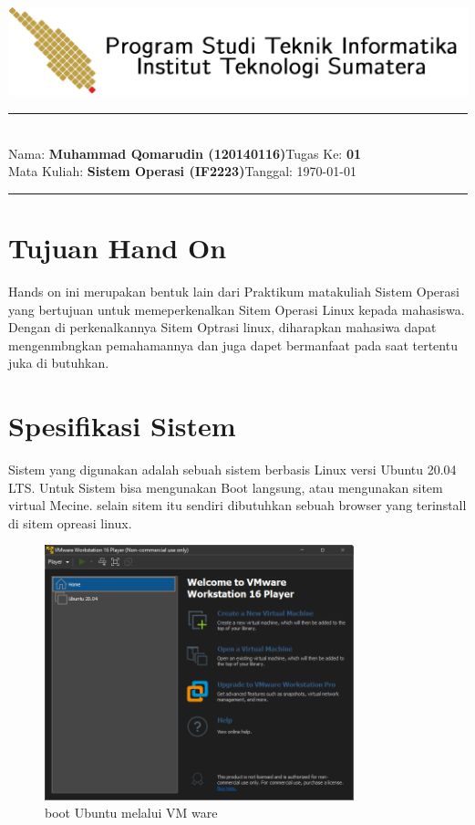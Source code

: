 \documentclass[11pt,a4paper]{article}
\newcommand{\stuid}{120140116}
\newcommand{\student}{\textbf{Muhammad Qomarudin (\stuid{})}}
\newcommand{\course}{\textbf{Sistem Operasi (IF2223)}}
\newcommand{\assignment}{\textbf{01}} %
\begin{document}
\thispagestyle{empty}
\begin{center}
	\includegraphics[scale = 0.15]{Figure/ifitera-header.png}
	\vspace{0.1cm}
\end{center}
\noindent
{\large
\rule{17cm}{0.2cm}\\[0.3cm]
Nama: \student \hfill Tugas Ke: \assignment\\[0.1cm]
Mata Kuliah: \course \hfill Tanggal: \today\\
\rule{17cm}{0.05cm}
\vspace{0.1cm}
}



\section{Tujuan Hand On}
	Hands on ini merupakan bentuk lain dari Praktikum matakuliah Sistem Operasi yang bertujuan untuk
	memeperkenalkan Sitem Operasi Linux kepada mahasiswa.
	Dengan di perkenalkannya Sitem Optrasi linux,
	diharapkan mahasiwa dapat mengenmbngkan pemahamannya dan juga dapet bermanfaat pada saat tertentu juka di butuhkan.

\section{Spesifikasi Sistem}
    Sistem yang digunakan adalah sebuah sistem berbasis Linux versi Ubuntu 20.04 LTS. Untuk Sistem bisa mengunakan Boot langsung, atau mengunakan sitem virtual Mecine. selain sitem itu sendiri dibutuhkan sebuah browser yang terinstall di sitem opreasi linux.
	\begin{figure}[h]
		\centering
		\includegraphics[width=0.8\textwidth]{figure/VM ware.png}
		\caption{boot Ubuntu melalui VM ware}
	\end{figure}
 
\end{document}

